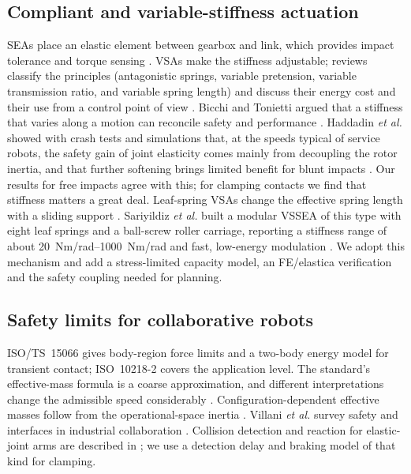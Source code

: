 \documentclass[journal]{IEEEtran}
\begin{document}
\subsection{Compliant and variable-stiffness actuation}
SEAs \cite{pratt1995} place an elastic element between gearbox and link, which provides impact tolerance and torque sensing \cite{vanham2009}. VSAs make the stiffness adjustable; reviews classify the principles (antagonistic springs, variable pretension, variable transmission ratio, and variable spring length) and discuss their energy cost \cite{vanderborght2013,wolf2016} and their use from a control point of view \cite{grioli2015}. Bicchi and Tonietti argued that a stiffness that varies along a motion can reconcile safety and performance \cite{bicchi2004,tonietti2005}. Haddadin \emph{et al.} showed with crash tests and simulations that, at the speeds typical of service robots, the safety gain of joint elasticity comes mainly from decoupling the rotor inertia, and that further softening brings limited benefit for blunt impacts \cite{haddadin2009}. Our results for free impacts agree with this; for clamping contacts we find that stiffness matters a great deal. Leaf-spring VSAs change the effective spring length with a sliding support \cite{choi2011}. Sariyildiz \emph{et al.} built a modular VSSEA of this type with eight leaf springs and a ball-screw roller carriage, reporting a stiffness range of about \SIrange{20}{1000}{Nm/rad} and fast, low-energy modulation \cite{sariyildiz2023,sariyildiz2024}. We adopt this mechanism and add a stress-limited capacity model, an FE/elastica verification and the safety coupling needed for planning.

\subsection{Safety limits for collaborative robots}
ISO/TS~15066 \cite{iso15066} gives body-region force limits and a two-body energy model for transient contact; ISO~10218-2 \cite{iso10218_2} covers the application level. The standard's effective-mass formula is a coarse approximation, and different interpretations change the admissible speed considerably \cite{kirschner2022}. Configuration-dependent effective masses follow from the operational-space inertia \cite{khatib1987}. Villani \emph{et al.} survey safety and interfaces in industrial collaboration \cite{villani2018}. Collision detection and reaction for elastic-joint arms are described in \cite{deluca2006}; we use a detection delay and braking model of that kind for clamping.
\end{document}
